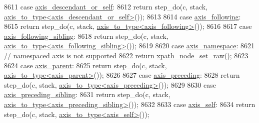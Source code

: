 \begin{DoxyCode}
8611                 \textcolor{keywordflow}{case} \hyperlink{pugixml_8cpp_ae7747145441b0591a5c04f20f6f9189aaa4371804013320e9798cea401cffa22d}{axis\_descendant\_or\_self}:
8612                     \textcolor{keywordflow}{return} step\_do(c, stack, 
      \hyperlink{structaxis__to__type}{axis\_to\_type<axis\_descendant\_or\_self>}());
8613 
8614                 \textcolor{keywordflow}{case} \hyperlink{pugixml_8cpp_ae7747145441b0591a5c04f20f6f9189aacb21ff57ba23bbf8e9bb3aa6e6d47106}{axis\_following}:
8615                     \textcolor{keywordflow}{return} step\_do(c, stack, \hyperlink{structaxis__to__type}{axis\_to\_type<axis\_following>}());
8616                 
8617                 \textcolor{keywordflow}{case} \hyperlink{pugixml_8cpp_ae7747145441b0591a5c04f20f6f9189aa57a9f91a01f40c54aae642eefb9523c0}{axis\_following\_sibling}:
8618                     \textcolor{keywordflow}{return} step\_do(c, stack, 
      \hyperlink{structaxis__to__type}{axis\_to\_type<axis\_following\_sibling>}());
8619                 
8620                 \textcolor{keywordflow}{case} \hyperlink{pugixml_8cpp_ae7747145441b0591a5c04f20f6f9189aaf530e34cb512f4b88fbb4b2caec602a0}{axis\_namespace}:
8621                     \textcolor{comment}{// namespaced axis is not supported}
8622                     \textcolor{keywordflow}{return} \hyperlink{classxpath__node__set__raw}{xpath\_node\_set\_raw}();
8623                 
8624                 \textcolor{keywordflow}{case} \hyperlink{pugixml_8cpp_ae7747145441b0591a5c04f20f6f9189aafa5cf248a5e26f36caf8163293db25a9}{axis\_parent}:
8625                     \textcolor{keywordflow}{return} step\_do(c, stack, \hyperlink{structaxis__to__type}{axis\_to\_type<axis\_parent>}());
8626                 
8627                 \textcolor{keywordflow}{case} \hyperlink{pugixml_8cpp_ae7747145441b0591a5c04f20f6f9189aa0b356ec6c3e3dec19179067e73db7089}{axis\_preceding}:
8628                     \textcolor{keywordflow}{return} step\_do(c, stack, \hyperlink{structaxis__to__type}{axis\_to\_type<axis\_preceding>}());
8629 
8630                 \textcolor{keywordflow}{case} \hyperlink{pugixml_8cpp_ae7747145441b0591a5c04f20f6f9189aaef80578171e44825bd50265feb9a32dc}{axis\_preceding\_sibling}:
8631                     \textcolor{keywordflow}{return} step\_do(c, stack, 
      \hyperlink{structaxis__to__type}{axis\_to\_type<axis\_preceding\_sibling>}());
8632                 
8633                 \textcolor{keywordflow}{case} \hyperlink{pugixml_8cpp_ae7747145441b0591a5c04f20f6f9189aac3dba2fdf066d765a93e20508450e924}{axis\_self}:
8634                     \textcolor{keywordflow}{return} step\_do(c, stack, \hyperlink{structaxis__to__type}{axis\_to\_type<axis\_self>}());

\end{DoxyCode}
